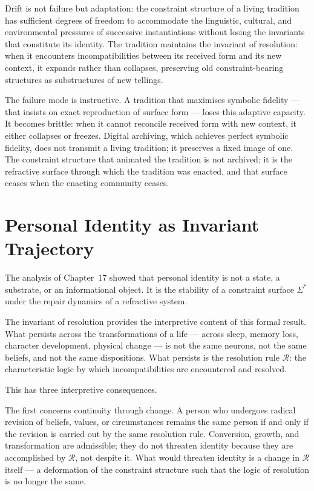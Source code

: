 \documentclass[11pt,openany]{book}
\begin{document}
Drift is not failure but adaptation: the constraint
structure of a living tradition has sufficient degrees of
freedom to accommodate the linguistic, cultural, and
environmental pressures of successive instantiations without
losing the invariants that constitute its identity.
The tradition maintains the invariant of resolution: when
it encounters incompatibilities between its received form
and its new context, it expands rather than collapses,
preserving old constraint-bearing structures as
substructures of new tellings.

The failure mode is instructive.  A tradition that
maximises symbolic fidelity --- that insists on exact
reproduction of surface form --- loses this adaptive
capacity.  It becomes brittle: when it cannot reconcile
received form with new context, it either collapses or
freezes.  Digital archiving, which achieves perfect
symbolic fidelity, does not transmit a living tradition; it
preserves a fixed image of one.  The constraint structure
that animated the tradition is not archived; it is the
refractive surface through which the tradition was enacted,
and that surface ceases when the enacting community ceases.

\section{Personal Identity as Invariant Trajectory}
\label{sec:personal-identity}

The analysis of Chapter~17 showed that personal identity is
not a state, a substrate, or an informational object.  It
is the stability of a constraint surface $\Sigma^*$ under
the repair dynamics of a refractive system.

The invariant of resolution provides the interpretive
content of this formal result.  What persists across the
transformations of a life --- across sleep, memory loss,
character development, physical change --- is not the same
neurons, not the same beliefs, and not the same
dispositions.  What persists is the resolution rule
$\mathcal{R}$: the characteristic logic by which
incompatibilities are encountered and resolved.

This has three interpretive consequences.

The first concerns continuity through change.  A person who
undergoes radical revision of beliefs, values, or
circumstances remains the same person if and only if the
revision is carried out by the same resolution rule.
Conversion, growth, and transformation are admissible; they
do not threaten identity because they are accomplished by
$\mathcal{R}$, not despite it.  What would threaten
identity is a change in $\mathcal{R}$ itself --- a
deformation of the constraint structure such that the logic
of resolution is no longer the same.
\end{document}
